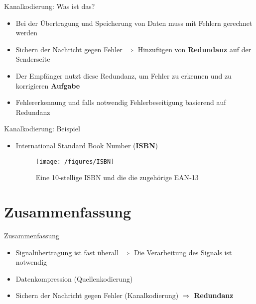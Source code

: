 \documentclass[handout,ngerman]{beamer}
\begin{document}
\begin{frame}{Kanalkodierung: Was ist das?}
	\begin{itemize}
		\item Bei der Übertragung und Speicherung von Daten muss mit \alert{Fehlern} gerechnet werden
		\item Sichern der Nachricht gegen Fehler \newline
		 $\Longrightarrow$ Hinzuf\"ugen von \textbf{\alert{Redundanz}} auf der Senderseite
		\item Der Empfänger nutzt diese Redundanz, um Fehler zu erkennen und zu korrigieren\newline\newline
	 \textbf{Aufgabe}
		\item \alert{Fehlererkennung} und falls notwendig \alert{Fehlerbeseitigung} basierend auf Redundanz
	\end{itemize}	  
\end{frame}


\begin{frame}{Kanalkodierung: Beispiel}
	\begin{itemize}
		\item International Standard Book Number (\textbf{ISBN})
		\begin{figure}[htbp]
 	 		\centering 	
 			\texttt{[image: /figures/ISBN]} 	 
 			\caption {Eine 10-stellige ISBN und die die zugeh\"orige EAN‑13 \cite{isbn}}
		\end{figure}
	\end{itemize}
\end{frame}

\section{Zusammenfassung}
\begin{frame}{Zusammenfassung}
	\begin{itemize}
		\item Signalübertragung ist fast überall\newline
		$\Rightarrow$ Die Verarbeitung des Signals ist notwendig\newline
		\item Datenkompression (Quellenkodierung)	\newline
		\item Sichern der Nachricht gegen Fehler (Kanalkodierung)\newline
		 $\Rightarrow$ \textbf{Redundanz}
	\end{itemize}  
\end{frame}
\end{document}
